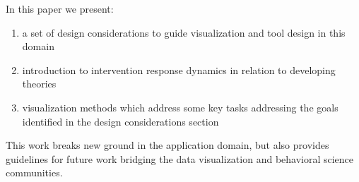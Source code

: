 In this paper we present:
\begin{enumerate}
	\item{a set of design considerations to guide visualization and tool design in this domain}
	\item{introduction to intervention response dynamics in relation to developing theories}
	\item{visualization methods which address some key tasks addressing the goals identified in the design considerations section}
\end{enumerate}


This work breaks new ground in the application domain, but also provides guidelines for future work bridging the data visualization and behavioral science communities.

